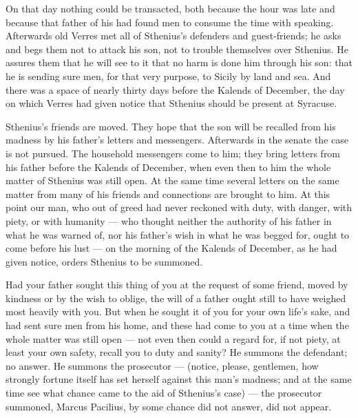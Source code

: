  On that day nothing could be transacted, both because the hour was late and because that father of his had found men to consume the time with speaking. Afterwards old Verres met all of Sthenius's defenders and guest-friends; he asks and begs them not to attack his son, not to trouble themselves over Sthenius. He assures them that he will see to it that no harm is done him through his son: that he is sending sure men, for that very purpose, to Sicily by land and sea. And there was a space of nearly thirty days before the Kalends of December, the day on which Verres had given notice that Sthenius should be present at Syracuse.

 Sthenius's friends are moved. They hope that the son will be recalled from his madness by his father's letters and messengers. Afterwards in the senate the case is not pursued. The household messengers come to him; they bring letters from his father before the Kalends of December, when even then to him the whole matter of Sthenius was still open. At the same time several letters on the same matter from many of his friends and connections are brought to him. At this point our man, who out of greed had never reckoned with duty, with danger, with piety, or with humanity --- who thought neither the authority of his father in what he was warned of, nor his father's wish in what he was begged for, ought to come before his lust --- on the morning of the Kalends of December, as he had given notice, orders Sthenius to be summoned.

 Had your father sought this thing of you at the request of some friend, moved by kindness or by the wish to oblige, the will of a father ought still to have weighed most heavily with you. But when he sought it of you for your own life's sake, and had sent sure men from his home, and these had come to you at a time when the whole matter was still open --- not even then could a regard for, if not piety, at least your own safety, recall you to duty and sanity? He summons the defendant; no answer. He summons the prosecutor --- (notice, please, gentlemen, how strongly fortune itself has set herself against this man's madness; and at the same time see what chance came to the aid of Sthenius's case) --- the prosecutor summoned, Marcus Pacilius, by some chance did not answer, did not appear.

